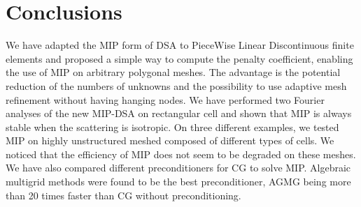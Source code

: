 \section{Conclusions} \label{sec_conc}
We have adapted the MIP form of DSA to PieceWise Linear Discontinuous finite elements
and proposed a simple way to compute the penalty coefficient, enabling the 
use of MIP on arbitrary polygonal meshes. The advantage is the potential 
reduction of the numbers of unknowns and the possibility to use adaptive mesh 
refinement without having hanging nodes. We have performed two Fourier analyses 
of the new MIP-DSA on rectangular cell and shown that MIP is always stable when 
the scattering is isotropic. On three different examples, we tested MIP on highly
unstructured meshed composed of different types of cells. We noticed that the
efficiency of MIP does not seem to be degraded on these meshes. We have also
compared different preconditioners for CG to solve MIP. Algebraic multigrid
methods were found to be the best preconditioner, AGMG being more than 20 times
faster than CG without preconditioning.
